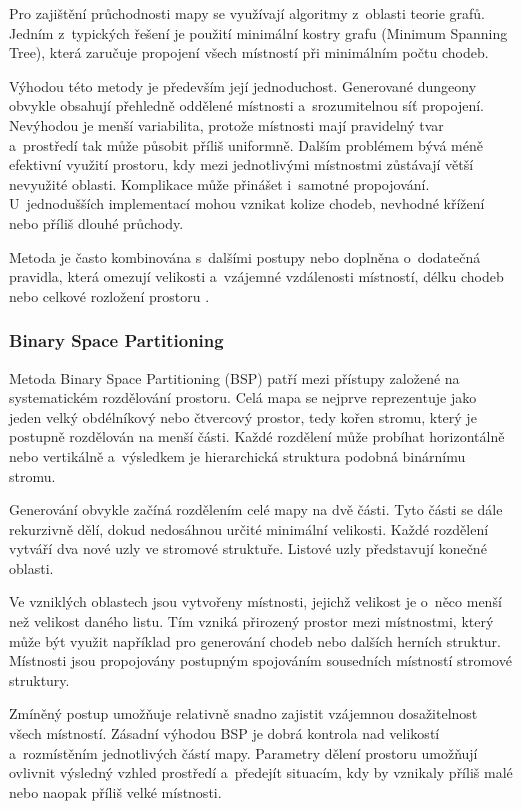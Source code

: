 \documentclass[
   program=itk,
   biblatex,
   figures=true,
   tables=true,
   glossaries,
   index
]{kidiplom}
\begin{document}
Pro zajištění průchodnosti mapy se využívají algoritmy z~oblasti teorie grafů. Jedním z~typických řešení je použití minimální kostry grafu (Minimum Spanning Tree), která zaručuje propojení všech místností při minimálním počtu chodeb.

Výhodou této metody je především její jednoduchost. Generované dungeony obvykle obsahují přehledně oddělené místnosti a~srozumitelnou síť propojení. Nevýhodou je menší variabilita, protože místnosti mají pravidelný tvar a~prostředí tak může působit příliš uniformně. Dalším problémem bývá méně efektivní využití prostoru, kdy mezi jednotlivými místnostmi zůstávají větší nevyužité oblasti. Komplikace může přinášet i~samotné propojování. U~jednodušších implementací mohou vznikat kolize chodeb, nevhodné křížení nebo příliš dlouhé průchody.

Metoda je často kombinována s~dalšími postupy nebo doplněna o~dodatečná pravidla, která omezují velikosti a~vzájemné vzdálenosti místností, délku chodeb nebo celkové rozložení prostoru \cite{Linden2014,Shaker2016}.

\subsubsection{Binary Space Partitioning}

Metoda Binary Space Partitioning (BSP) patří mezi přístupy založené na systematickém rozdělování prostoru. Celá mapa se nejprve reprezentuje jako jeden velký obdélníkový nebo čtvercový prostor, tedy kořen stromu, který je postupně rozdělován na menší části. Každé rozdělení může probíhat horizontálně nebo vertikálně a~výsledkem je hierarchická struktura podobná binárnímu stromu.

Generování obvykle začíná rozdělením celé mapy na dvě části. Tyto části se dále rekurzivně dělí, dokud nedosáhnou určité minimální velikosti. Každé rozdělení vytváří dva nové uzly ve stromové struktuře. Listové uzly představují konečné oblasti.

Ve vzniklých oblastech jsou vytvořeny místnosti, jejichž velikost je o~něco menší než velikost daného listu. Tím vzniká přirozený prostor mezi místnostmi, který může být využit například pro generování chodeb nebo dalších herních struktur. Místnosti jsou propojovány postupným spojováním sousedních místností stromové struktury.

Zmíněný postup umožňuje relativně snadno zajistit vzájemnou dosažitelnost všech místností. Zásadní výhodou BSP je dobrá kontrola nad velikostí a~rozmístěním jednotlivých částí mapy. Parametry dělení prostoru umožňují ovlivnit výsledný vzhled prostředí a~předejít situacím, kdy by vznikaly příliš malé nebo naopak příliš velké místnosti.
\end{document}
